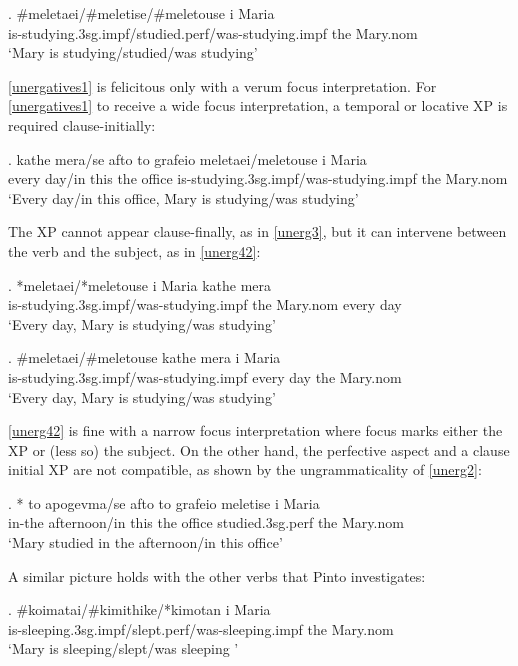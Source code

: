\documentclass[11pt]{article}
\begin{document}
\exg.
\#meletaei/\#meletise/\#meletouse i Maria\\
is-studying.3sg.impf/studied.perf/was-studying.impf the Mary.nom\label{unergatives1}\\
`Mary is studying/studied/was studying'

\ref{unergatives1} is felicitous only with a verum focus interpretation. For \ref{unergatives1} to receive a wide focus interpretation, a temporal or locative XP is required clause-initially:

\exg.
kathe mera/se afto to grafeio meletaei/meletouse i Maria\\
every day/in this the office is-studying.3sg.impf/was-studying.impf the Mary.nom\label{unergatives2}\\
`Every day/in this office, Mary is studying/was studying'

The XP cannot appear clause-finally, as in \ref{unerg3}, but it can intervene between the verb and the subject, as in \ref{unerg42}:

\exg.
*meletaei/*meletouse i Maria kathe mera\\
is-studying.3sg.impf/was-studying.impf the Mary.nom every day\label{unerg3}\\
`Every day, Mary is studying/was studying'

\exg.
\#meletaei/\#meletouse kathe mera i Maria\\
is-studying.3sg.impf/was-studying.impf every day the Mary.nom \label{unerg42}\\
`Every day, Mary is studying/was studying'

 \ref{unerg42} is fine with a narrow focus interpretation where focus marks either the XP or  (less so) the subject. On the other hand, the perfective aspect and a clause initial XP are not compatible, as shown by the ungrammaticality of \ref{unerg2}:

\exg.
* to apogevma/se afto to grafeio meletise i Maria\\
in-the afternoon/in this the office studied.3sg.perf the Mary.nom\\ \label{unerg2}
`Mary studied in the afternoon/in this office'

A similar picture holds with the other verbs that Pinto investigates:

\exg.
\#koimatai/\#kimithike/*kimotan i Maria\\
 is-sleeping.3sg.impf/slept.perf/was-sleeping.impf the Mary.nom\label{unergative4}\\
`Mary is sleeping/slept/was sleeping '
\end{document}
